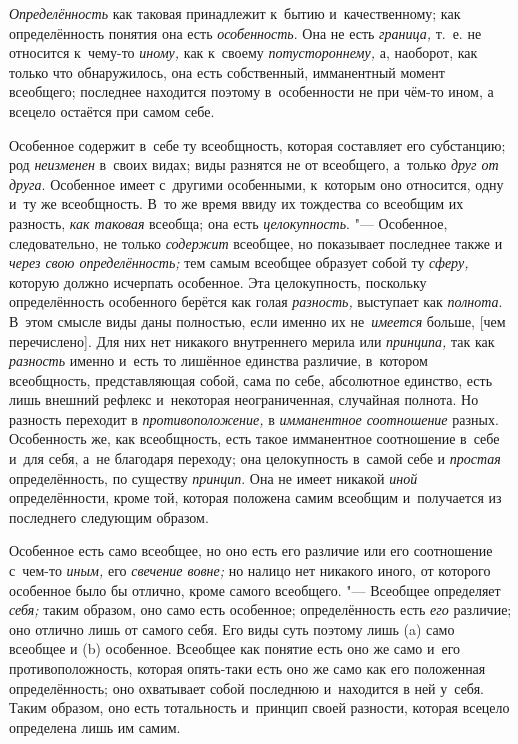 {\em Определённость} как таковая принадлежит к~бытию и~качественному; как
определённость понятия она есть {\em особенность}. Она не есть {\em граница,}
т.~е. не относится к~чему-то {\em иному,} как к~своему {\em потустороннему,} а,
наоборот, как только что обнаружилось, она есть собственный, имманентный момент
всеобщего; последнее находится поэтому в~особенности не при чём-то ином, а
всецело остаётся при самом себе.

Особенное содержит в~себе ту всеобщность, которая составляет его субстанцию;
род {\em неизменен} в~своих видах; виды разнятся не от всеобщего, а~только
{\em друг от друга}. Особенное имеет с~другими особенными, к~которым оно
относится, одну и~ту же всеобщность. В~то же время ввиду их тождества со
всеобщим их разность,
{\em как таковая} всеобща; она есть {\em целокупность}. "--- Особенное,
следовательно, не только {\em содержит} всеобщее, но показывает последнее
также и {\em через свою определённость;} тем самым всеобщее образует собой
ту {\em сферу,} которую должно исчерпать особенное. Эта целокупность, поскольку
определённость особенного берётся как голая {\em разность,} выступает как
{\em полнота}. В~этом смысле виды даны полностью, если именно их
не~{\em имеется} больше, [чем перечислено]. Для них нет никакого внутреннего
мерила или {\em принципа,} так как {\em разность} именно и~есть то лишённое
единства различие, в~котором всеобщность, представляющая собой, сама по себе,
абсолютное единство, есть лишь внешний рефлекс и~некоторая неограниченная,
случайная полнота. Но разность переходит в {\em противоположение,}
в {\em имманентное соотношение} разных. Особенность же, как всеобщность, есть
такое имманентное соотношение в~себе и~для себя, а~не благодаря переходу; она
целокупность в~самой себе и {\em простая} определённость, по существу
{\em принцип}. Она не имеет никакой {\em иной} определённости, кроме той,
которая положена самим всеобщим и~получается из последнего следующим образом.

Особенное есть само всеобщее, но оно есть его различие или его
соотношение с~чем-то {\em иным,} его {\em свечение
вовне;} но налицо нет никакого иного, от которого особенное было бы отлично,
кроме самого всеобщего. "--- Всеобщее определяет {\em себя;} таким
образом, оно само есть особенное; определённость есть {\em его} различие; оно
отлично лишь от самого себя. Его виды суть поэтому лишь (a)
само всеобщее и (b) особенное. Всеобщее как понятие есть оно
же само и~его противоположность, которая опять-таки есть оно же само как
его положенная определённость; оно охватывает собой последнюю и~находится в
ней у~себя. Таким образом, оно есть тотальность и~принцип своей разности,
которая всецело определена лишь им самим.


